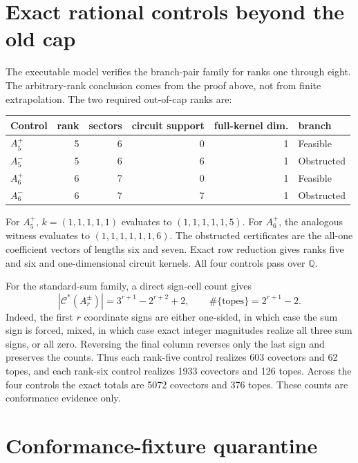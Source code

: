 \documentclass[11pt]{article}
\newcommand{\Q}{\mathbb{Q}}
\newcommand{\Cstar}{\mathcal{C}^{*}}
\begin{document}
\section{Exact rational controls beyond the old cap}

The executable model verifies the branch-pair family for ranks one through
eight.  The arbitrary-rank conclusion comes from the proof above, not from
finite extrapolation.  The two required out-of-cap ranks are:

\begin{center}
\begin{tabular}{lrrrrl}
\toprule
Control & rank & sectors & circuit support & full-kernel dim. & branch\\
\midrule
$A_5^+$ & 5 & 6 & 0 & 1 & Feasible\\
$A_5^-$ & 5 & 6 & 6 & 1 & Obstructed\\
$A_6^+$ & 6 & 7 & 0 & 1 & Feasible\\
$A_6^-$ & 6 & 7 & 7 & 1 & Obstructed\\
\bottomrule
\end{tabular}
\end{center}

For $A_5^+$, $k=(1,1,1,1,1)$ evaluates to
$(1,1,1,1,1,5)$.  For $A_6^+$, the analogous witness evaluates to
$(1,1,1,1,1,1,6)$.  The obstructed certificates are the all-one coefficient
vectors of lengths six and seven.  Exact row reduction gives ranks five and
six and one-dimensional circuit kernels.  All four controls pass over $\Q$.

For the standard-sum family, a direct sign-cell count gives
\[
 |\Cstar(A_r^\pm)|=3^{r+1}-2^{r+2}+2,
 \qquad
 \#\{\text{topes}\}=2^{r+1}-2.
\]
Indeed, the first $r$ coordinate signs are either one-sided, in which case the
sum sign is forced, mixed, in which case exact integer magnitudes realize all
three sum signs, or all zero.  Reversing the final column reverses only the
last sign and preserves the counts.  Thus each rank-five control realizes 603
covectors and 62 topes, and each rank-six control realizes 1933 covectors and
126 topes.  Across the four controls the exact totals are 5072 covectors and
376 topes.  These counts are conformance evidence only.

\section{Conformance-fixture quarantine}
\end{document}
